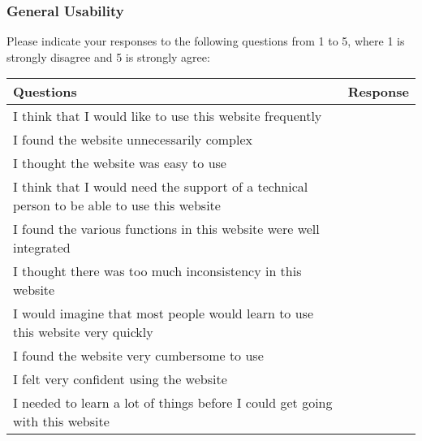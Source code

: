 \subsubsection{General Usability}
Please indicate your responses to the following questions from 1 to 5, where 1 is strongly disagree and 5 is strongly agree:

\begin{table}[h]
\centering
\renewcommand{\arraystretch}{1.5} %
\begin{tabularx}{\textwidth}{|X|c|} %
\hline
\textbf{Questions} & \textbf{Response} \\ \hline
I think that I would like to use this website frequently &  \\ \hline
I found the website unnecessarily complex &  \\ \hline
I thought the website was easy to use &  \\ \hline
I think that I would need the support of a technical person to be able to use this website &  \\ \hline
I found the various functions in this website were well integrated &  \\ \hline
I thought there was too much inconsistency in this website &  \\ \hline
I would imagine that most people would learn to use this website very quickly &  \\ \hline
I found the website very cumbersome to use &  \\ \hline
I felt very confident using the website &  \\ \hline
I needed to learn a lot of things before I could get going with this website &  \\ \hline
\end{tabularx}
\end{table}
